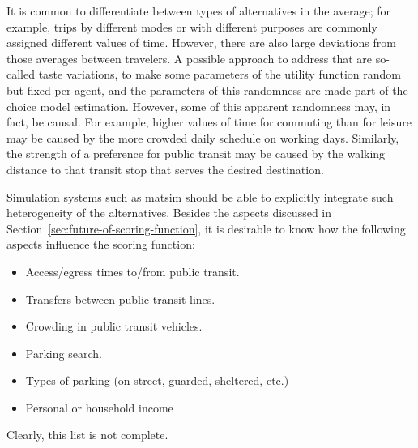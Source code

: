 It is common to differentiate between types of alternatives in the average; for example, trips by different modes or with different purposes are commonly assigned different values of time.
%
However, there are also large deviations from those averages between travelers.
%
A possible approach to address that are so-called taste variations, \ie to make some parameters of the utility function random but fixed per agent, and the parameters of this randomness are made part of the choice model estimation.
%
However, some of this apparent randomness may, in fact, be causal.
%
For example, higher values of time for commuting than for leisure may be caused by the more crowded daily schedule on working days.  Similarly, the strength of a preference for public transit may be caused by the walking distance to that transit stop that serves the desired destination.

Simulation systems such as \gls{matsim} should be able to explicitly integrate such heterogeneity of the alternatives.  
Besides the aspects discussed in 
Section~\ref{sec:future-of-scoring-function},
it is desirable to know how the following aspects influence the scoring function:
\begin{itemize}

\item Access/egress times to/from public transit.

\item Transfers between public transit lines.

\item Crowding in public transit vehicles.

\item Parking search.

\item Types of parking (on-street, guarded, sheltered, etc.)

\item Personal or household income

\end{itemize}
Clearly, this list is not complete.

